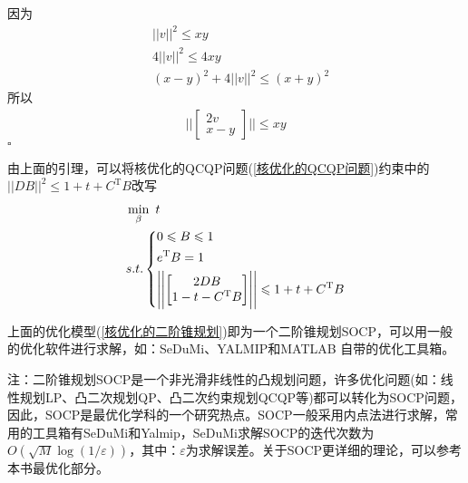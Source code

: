         \begin{Proof}
        因为
        \begin{align*}
        & ||v||^2 \leqslant xy\\
        & 4||v||^2 \leqslant 4xy\\
        & (x-y)^2 + 4||v||^2 \leqslant (x+y)^2
        \end{align*}
        所以
        \begin{align*}
        \Biggl |\Biggl|
        \begin{bmatrix}
        2v\\
        x-y
        \end{bmatrix}
        \Biggr |\Biggr|
        \leqslant xy
        \end{align*}
        $\square$
        \end{Proof}
        由上面的引理，可以将核优化的QCQP问题(\ref{核优化的QCQP问题})约束中的$||DB||^2 \leqslant 1+t+ C^\mathrm{T}B$改写
        \begin{align}
        \label{核优化的二阶锥规划}
        &\min_\beta  \ t \notag\\
        &s.t.
        \left\{
        \begin{aligned}
        & 0 \leqslant B \leqslant 1\\
        & e^\mathrm{T} B = 1 \\
        & \Biggl |\Biggl|
        \begin{bmatrix}
        2DB\\
        1-t-C^\mathrm{T}B
        \end{bmatrix}
        \Biggr |\Biggr| \leqslant 1+t+C^\mathrm{T}B
        \end{aligned}
        \right.
        \end{align}
        \par
        上面的优化模型(\ref{核优化的二阶锥规划})即为一个二阶锥规划SOCP，可以用一般的优化软件进行求解，如：SeDuMi、YALMIP和MATLAB 自带的优化工具箱。
        \par
        注：二阶锥规划SOCP是一个非光滑非线性的凸规划问题，许多优化问题(如：线性规划LP、凸二次规划QP、凸二次约束规划QCQP等)都可以转化为SOCP问题，因此，SOCP是最优化学科的一个研究热点。SOCP一般采用内点法进行求解，常用的工具箱有SeDuMi和Yalmip，SeDuMi求解SOCP的迭代次数为$O(\sqrt{M}\log (1/\varepsilon))$，其中：$\varepsilon$为求解误差。关于SOCP更详细的理论，可以参考本书最优化部分。


